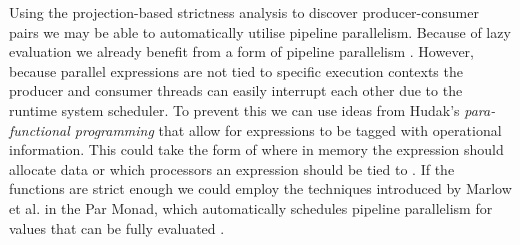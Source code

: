 Using the projection-based strictness analysis to discover producer-consumer
pairs we may be able to automatically utilise pipeline parallelism. Because of
lazy evaluation we already benefit from a form of pipeline parallelism
\citep{whyFPmatters}. However, because parallel expressions are not tied to
specific execution contexts  the producer and consumer threads can easily interrupt
each other due to the runtime system scheduler. To prevent this we can use
ideas from Hudak's \emph{para-functional programming} that allow for
expressions to be tagged with operational information. This could take the form
of where in memory the expression should allocate data or which processors an
expression should be tied to \citep{hudak1986functional}. If the functions are
strict enough we could employ the techniques introduced by Marlow et al. in the
Par Monad, which automatically schedules pipeline parallelism for values that
can be fully evaluated \citep{marlow2011monad}.
